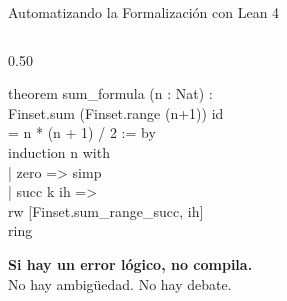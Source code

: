 \documentclass[aspectratio=169, 10pt]{beamer}
\begin{document}
\begin{frame}{Automatizando la Formalización con Lean 4}
\begin{columns}[T]
\begin{column}{0.50\textwidth}
      \colorbox{darkframe}{\parbox{\linewidth}{%
        \ttfamily\footnotesize\color{leanpurple}
        theorem sum\_formula (n : Nat) :\\[1pt]
        \hspace*{0.8em}Finset.sum (Finset.range (n+1)) id\\[1pt]
        \hspace*{0.8em}= n * (n + 1) / 2 := by\\[1pt]
        \hspace*{0.4em}induction n with\\[1pt]
        \hspace*{0.4em}| zero => simp\\[1pt]
        \hspace*{0.4em}| succ k ih =>\\[1pt]
        \hspace*{1.2em}rw [Finset.sum\_range\_succ, ih]\\[1pt]
        \hspace*{1.2em}ring
      }}\par\vspace{0.25cm}
      {\small\color{cpBlue}\textbf{Si hay un error l\'{o}gico, no compila.}\\
      No hay ambig\"{u}edad. No hay debate.}
    \end{column}
  \end{columns}
\end{frame}
\end{document}
